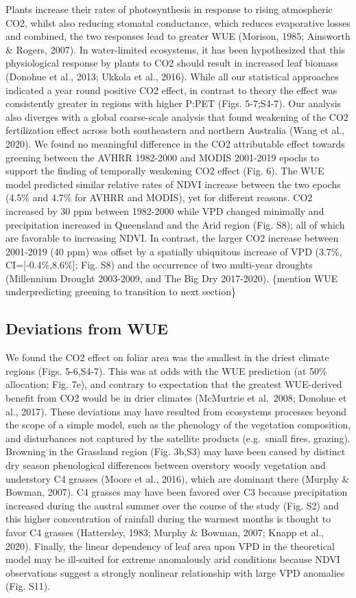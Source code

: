 \documentclass[gc, manuscript]{copernicus}
\begin{document}
Plants increase their rates of photosynthesis in response to rising
atmospheric CO2, whilst also reducing stomatal conductance, which
reduces evaporative losses and combined, the two responses lead to
greater WUE (Morison, 1985; Ainsworth \& Rogers, 2007). In water-limited
ecosystems, it has been hypothesized that this physiological response by
plants to CO2 should result in increased leaf biomass (Donohue et al.,
2013; Ukkola et al., 2016). While all our statistical approaches
indicated a year round positive CO2 effect, in contrast to theory the
effect was consistently greater in regions with higher P:PET (Figs.
5-7;S4-7). Our analysis also diverges with a global coarse-scale
analysis that found weakening of the CO2 fertilization effect across
both southeastern and northern Australia (Wang et al., 2020). We found
no meaningful difference in the CO2 attributable effect towards greening
between the AVHRR 1982-2000 and MODIS 2001-2019 epochs to support the
finding of temporally weakening CO2 effect (Fig. 6). The WUE model
predicted similar relative rates of NDVI increase between the two epochs
(4.5\% and 4.7\% for AVHRR and MODIS), yet for different reasons. CO2
increased by 30 ppm between 1982-2000 while VPD changed minimally and
precipitation increased in Queensland and the Arid region (Fig. S8); all
of which are favorable to increasing NDVI. In contrast, the larger CO2
increase between 2001-2019 (40 ppm) was offset by a spatially ubiquitous
increase of VPD (3.7\%, CI={[}-0.4\%,8.6\%{]}; Fig. S8) and the
occurrence of two multi-year droughts (Millennium Drought 2003-2009, and
The Big Dry 2017-2020). \{mention WUE underpredicting greening to
transition to next section\}

\subsection{Deviations from WUE}

We found the CO2 effect on foliar area was the smallest in the driest
climate regions (Figs. 5-6,S4-7). This was at odds with the WUE
prediction (at 50\% allocation; Fig. 7e), and contrary to expectation
that the greatest WUE-derived benefit from CO2 would be in drier
climates (McMurtrie et al.~2008; Donohue et al., 2017). These deviations
may have resulted from ecosystems processes beyond the scope of a simple
model, such as the phenology of the vegetation composition, and
disturbances not captured by the satellite products (e.g.~small fires,
grazing). Browning in the Grassland region (Fig. 3b,S3) may have been
caused by distinct dry season phenological differences between overstory
woody vegetation and understory C4 grasses (Moore et al., 2016), which
are dominant there (Murphy \& Bowman, 2007). C4 grasses may have been
favored over C3 because precipitation increased during the austral
summer over the course of the study (Fig. S2) and this higher
concentration of rainfall during the warmest months is thought to favor
C4 grasses (Hattersley, 1983; Murphy \& Bowman, 2007; Knapp et al.,
2020). Finally, the linear dependency of leaf area upon VPD in the
theoretical model may be ill-suited for extreme anomalously arid
conditions because NDVI observations suggest a strongly nonlinear
relationship with large VPD anomalies (Fig. S11).
\end{document}
